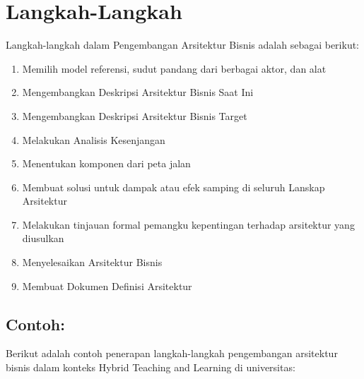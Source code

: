 \section{Langkah-Langkah}
Langkah-langkah dalam Pengembangan Arsitektur Bisnis adalah sebagai berikut:
\begin{enumerate}
	\item Memilih model referensi, sudut pandang dari berbagai aktor, dan alat
	\item Mengembangkan Deskripsi Arsitektur Bisnis Saat Ini
	\item Mengembangkan Deskripsi Arsitektur Bisnis Target
	\item Melakukan Analisis Kesenjangan
	\item Menentukan komponen dari peta jalan
	\item Membuat solusi untuk dampak atau efek samping di seluruh Lanskap Arsitektur
	\item Melakukan tinjauan formal pemangku kepentingan terhadap arsitektur yang diusulkan
	\item Menyelesaikan Arsitektur Bisnis
	\item Membuat Dokumen Definisi Arsitektur
\end{enumerate}

\subsection*{Contoh:}
Berikut adalah contoh penerapan langkah-langkah pengembangan arsitektur bisnis dalam konteks Hybrid Teaching and Learning di universitas:

